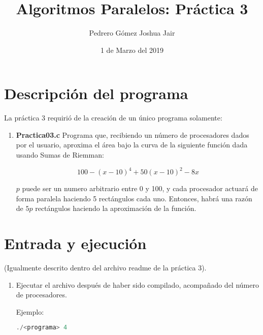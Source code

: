 \documentclass{article}
\title{Algoritmos Paralelos: Práctica 3}
\author{Pedrero Gómez Joshua Jair}
\date{1 de Marzo del 2019}
\begin{document}
\maketitle

\section{Descripción del programa}

La práctica 3 requirió de la creación de un único programa solamente:

\begin{enumerate}
	\item {\bf Practica03.c} \linebreak
	Programa que, recibiendo un número de procesadores dados por el usuario, aproxima el área bajo la curva de la siguiente función dada usando Sumas de Riemman:
	
	$$100-(x-10)^4+50(x-10)^2-8x$$
	
	$p$ puede ser un numero arbitrario entre 0 y 100, y cada procesador actuará de forma paralela haciendo 5 rectángulos cada uno. Entonces, habrá una razón de $5p$ rectángulos haciendo la aproximación de la función.
\end{enumerate}

\section{Entrada y ejecución}

(Igualmente descrito dentro del archivo readme de la práctica 3).

\begin{enumerate}
	\item Ejecutar el archivo después de haber sido compilado, acompañado del número de procesadores.
	
	Ejemplo: 
	
	\begin{lstlisting}[language=c]
	./<programa> 4
	\end{lstlisting}
\end{enumerate}
\end{document}
